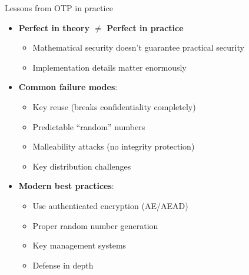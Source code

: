 \documentclass[aspectratio=169, lualatex, handout]{beamer}
\begin{document}
\begin{frame}{Lessons from OTP in practice}
	\begin{itemize}[<+->]
		\item \textbf{Perfect in theory $\neq$ Perfect in practice}
		      \begin{itemize}[<+->]
			      \item Mathematical security doesn't guarantee practical security
			      \item Implementation details matter enormously
		      \end{itemize}
		\item \textbf{Common failure modes}:
		      \begin{itemize}[<+->]
			      \item Key reuse (breaks confidentiality completely)
			      \item Predictable ``random'' numbers
			      \item Malleability attacks (no integrity protection)
			      \item Key distribution challenges
		      \end{itemize}
		\item \textbf{Modern best practices}:
		      \begin{itemize}[<+->]
			      \item Use authenticated encryption (AE/AEAD)
			      \item Proper random number generation
			      \item Key management systems
			      \item Defense in depth
		      \end{itemize}
	\end{itemize}
\end{frame}
\end{document}
